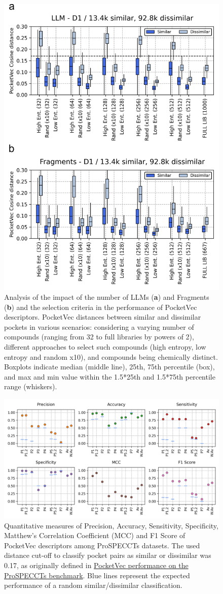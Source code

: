 \begin{figure}[htbp]
  \centering
  \includegraphics[width=0.6\linewidth]{figures/PocketVec/Supplementary/FigS12.png}
  \caption{
  Analysis of the impact of the number of LLMs (\textbf{a}) and Fragments (\textbf{b}) and the selection criteria in the performance of PocketVec descriptors. PocketVec distances between similar and dissimilar pockets in various scenarios: considering a varying number of compounds (ranging from 32 to full libraries by powers of 2), different approaches to select such compounds (high entropy, low entropy and random x10), and compounds being chemically distinct. Boxplots indicate median (middle line), 25th, 75th percentile (box), and max and min value within the 1.5*25th and 1.5*75th percentile range (whiskers).
  }
  \label{PocketVec_FigS12}
\end{figure}

\begin{figure}[htbp]
  \centering
  \includegraphics[width=0.85\linewidth]{figures/PocketVec/Supplementary/FigS13.png}
  \caption{
  Quantitative measures of Precision, Accuracy, Sensitivity, Specificity, Matthew’s Correlation Coefficient (MCC) and F1 Score of PocketVec descriptors among ProSPECCTs datasets. The used distance cut-off to classify pocket pairs as similar or dissimilar was 0.17, as originally defined in \hyperref[PocketVec_ResultsAndDiscussion_PocketVec_performance_on_the_ProSPECCTs_benchmark]{PocketVec performance on the ProSPECCTs benchmark}. Blue lines represent the expected performance of a random similar/dissimilar classification. 
  }
  \label{PocketVec_FigS13}
\end{figure}


